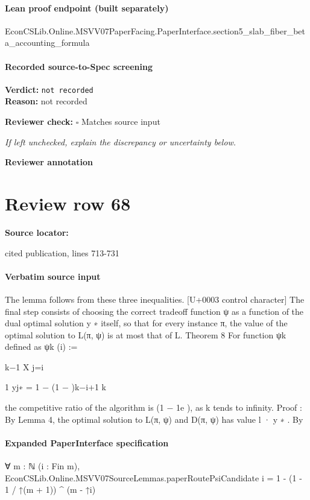 \documentclass[10pt]{article}
\newcommand{\reviewerbox}{%
  \par\noindent\fbox{\parbox{0.96\linewidth}{\rule{0pt}{0.38in}}}\par
}
\newcommand{\reviewmatch}[1]{%
  \par\noindent\textbf{Reviewer check:} $\square$\; #1\par
  \noindent\emph{If left unchecked, explain the discrepancy or uncertainty below.}\par
}
\begin{document}
\paragraph{Lean proof endpoint (built separately)}\begin{ReviewVerbatim}
EconCSLib.Online.MSVV07PaperFacing.PaperInterface.section5_slab_fiber_beta_accounting_formula
\end{ReviewVerbatim}

\paragraph{Recorded source-to-Spec screening}
\textbf{Verdict:} \texttt{not recorded}
\\
\textbf{Reason:} not recorded
\reviewmatch{Matches source input}
\noindent\textbf{Reviewer annotation}\par
\reviewerbox
\clearpage
\hypertarget{source-claim-e9807dde23353573}{}
\section*{Review row 68}
\textbf{Source locator:} {\footnotesize\raggedright cited publication, lines 713-\allowbreak{}731\par}
\paragraph{Verbatim source input}
\begin{ReviewVerbatim}
The lemma follows from these three inequalities.
[U+0003 control character]
The final step consists of choosing the correct tradeoff function ψ as a function of the dual
optimal solution y ∗ itself, so that for every instance π, the value of the optimal solution to
L(π, ψ) is at most that of L.
Theorem 8 For function ψk defined as
ψk (i) :=

k−1
X
j=i

1
yj∗ = 1 − (1 − )k−i+1
k

the competitive ratio of the algorithm is (1 − 1e ), as k tends to infinity.
Proof :
By Lemma 4, the optimal solution to L(π, ψ) and D(π, ψ) has value l · y ∗ . By
\end{ReviewVerbatim}


\paragraph{Expanded PaperInterface specification}
\begin{ReviewVerbatim}
∀ {m : ℕ} (i : Fin m), EconCSLib.Online.MSVV07SourceLemmas.paperRoutePsiCandidate i = 1 - (1 - 1 / ↑(m + 1)) ^ (m - ↑i)
\end{ReviewVerbatim}
\end{document}
